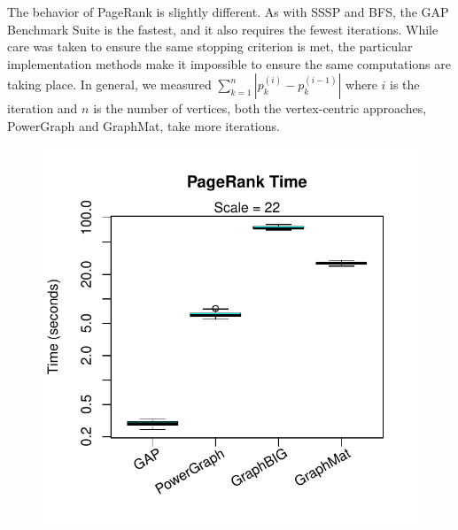 \documentclass{llncs}
\begin{document}
The behavior of PageRank is slightly different. As with SSSP and BFS, the GAP Benchmark Suite is the fastest, and it also requires the fewest iterations. While care was taken to ensure the same stopping criterion is met, the particular implementation methods make it impossible to ensure the same computations are taking place. In general, we measured $\sum_{k=1}^{n} |p_k^{(i)} - p_k^{(i-1)}|$ where $i$ is the iteration and $n$ is the number of vertices, both the vertex-centric approaches, PowerGraph and GraphMat, take more iterations.

\begin{figure}
	\centering
	\begin{minipage}{0.48\linewidth}
		\includegraphics[width=\linewidth, trim=0 18pt 18pt 0, clip]{graphics/pr_time.pdf}
	\end{minipage}
	\begin{minipage}{0.48\linewidth}

\end{minipage}
\end{figure}
\end{document}
